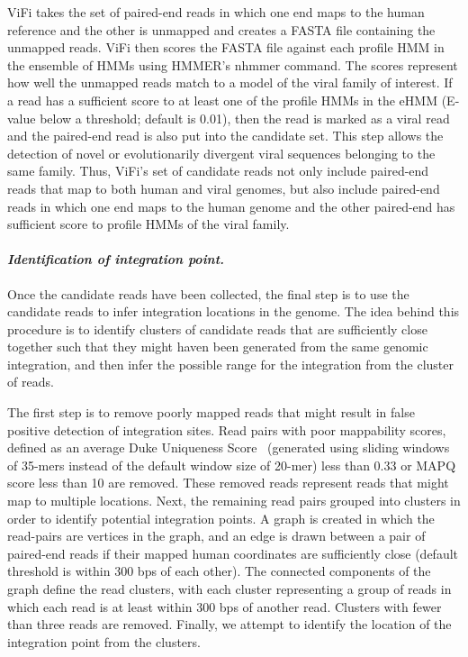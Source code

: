 \documentclass{bmcart}
\begin{document}
ViFi takes the set of paired-end reads in which one end maps to the human reference and the other is unmapped and creates a FASTA file containing the unmapped reads.  ViFi then scores the FASTA file against each profile
HMM in the ensemble of HMMs using HMMER's nhmmer command.  The scores represent how well the unmapped reads
match to a model of the viral family of interest.  If a read has a sufficient
score to at least one of the profile HMMs in the eHMM (E-value below a threshold; default is 0.01),
then the read is marked as a viral read and the paired-end read is also put
into the candidate set.  This step allows the detection of novel or evolutionarily divergent viral
sequences belonging to the same family.  Thus, ViFi's set of candidate reads not only include paired-end reads that map to both human and viral genomes, but also include paired-end reads in which one end maps to the human genome and the other paired-end has sufficient score to profile HMMs of the viral family. 

\paragraph{\emph{Identification of integration point.}}  Once the candidate reads have been collected, the final step is to use the candidate reads to infer integration locations in the genome.  The idea behind this procedure is to identify clusters of candidate reads that are sufficiently close together such that they might haven been generated from the same genomic integration, and then infer the possible range for the integration from the cluster of reads.  

The first step is to remove poorly mapped reads that might result in false positive detection of integration sites.  Read pairs with poor mappability scores, defined as an average Duke Uniqueness Score~\cite{Rosenbloom2013} (generated using sliding windows of 35-mers instead of the default window size of 20-mer) less than 0.33 or MAPQ score less than 10 are removed.  These removed reads represent reads that might map to multiple locations.  Next, the remaining read pairs grouped into clusters in order to identify potential integration points.  A graph is created in which the read-pairs are vertices in the graph, and an edge is drawn between a pair of paired-end reads if their mapped human coordinates are sufficiently close (default threshold is within 300 bps of each other).  The connected components of the graph define the read clusters, with each cluster representing a group of reads in which each read is at least within 300 bps of another read.  Clusters with fewer than three reads are removed.  Finally, we attempt to identify the location of the integration point from the clusters.  
\end{document}

